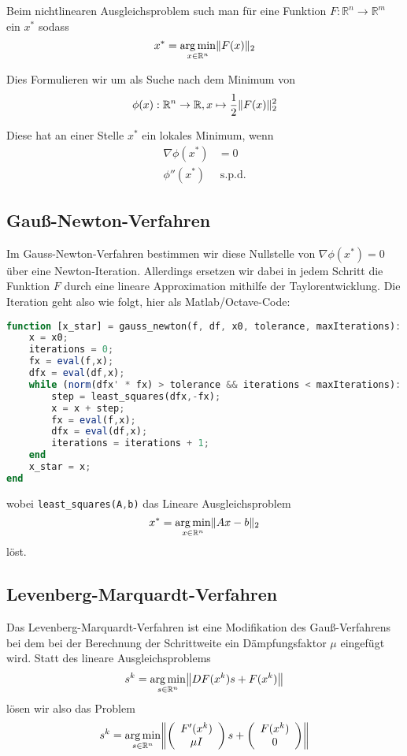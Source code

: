 \documentclass[a4paper,parskip=half*,DIV=7,fontsize=11pt]{scrartcl}
\DeclarePairedDelimiter\norm{\lVert}{\rVert}
\DeclareMathOperator*\argmin{arg\,min}
\newcommand{\grad}{\nabla}
\begin{document}
Beim nichtlinearen Ausgleichsproblem such man für eine Funktion $F : \mathbb{R}^n \to \mathbb{R}^m$ ein $x^\ast$ sodass
\[x^\ast = \argmin_{x \in \mathbb{R}^n} \norm{F(x)}_2\]

Dies Formulieren wir um als Suche nach dem Minimum von
\[\phi(x) : \mathbb{R}^n \to \mathbb{R}, x \mapsto \frac{1}{2} \norm{F(x)}_2^2 \]

Diese hat an einer Stelle $x^\ast$ ein lokales Minimum, wenn
\begin{align*}
	\grad\phi(x^\ast) &= 0	\\
    \phi''(x^\ast) &~\text{s.p.d.}
\end{align*}

\subsection{Gauß-Newton-Verfahren}

Im Gauss-Newton-Verfahren bestimmen wir diese Nullstelle von $\grad\phi(x^\ast) = 0$ über eine Newton-Iteration. Allerdings ersetzen wir dabei in jedem Schritt die Funktion $F$ durch eine lineare Approximation mithilfe der Taylorentwicklung. Die Iteration geht also wie folgt, hier als Matlab/Octave-Code:

\begin{lstlisting}[language=octave]
function [x_star] = gauss_newton(f, df, x0, tolerance, maxIterations):
    x = x0;
    iterations = 0;
    fx = eval(f,x);
    dfx = eval(df,x);
    while (norm(dfx' * fx) > tolerance && iterations < maxIterations):
        step = least_squares(dfx,-fx);
        x = x + step;
        fx = eval(f,x);
        dfx = eval(df,x);
        iterations = iterations + 1;
    end
    x_star = x;
end
\end{lstlisting}

wobei \lstinline[language=octave]{least_squares(A,b)} das Lineare Ausgleichsproblem
\[x^\ast = \argmin_{x \in \mathbb{R}^n} \norm{Ax-b}_2\]
löst.

\subsection{Levenberg-Marquardt-Verfahren}

Das Levenberg-Marquardt-Verfahren ist eine Modifikation des Gauß-Verfahrens bei dem bei der Berechnung der Schrittweite ein Dämpfungsfaktor $\mu$ eingefügt wird. Statt des lineare Ausgleichsproblems
\[s^k = \argmin_{s \in \mathbb{R}^n} \norm*{DF(x^k)s + F(x^k)}\]
lösen wir also das Problem
\[s^k = \argmin_{s \in \mathbb{R}^n} \norm*{\left(\begin{array}{c}
    F'(x^k)	\\	\mu I
\end{array}\right)s + \left(\begin{array}{c}
    F(x^k)	\\	0
\end{array}\right)}\]
\end{document}
